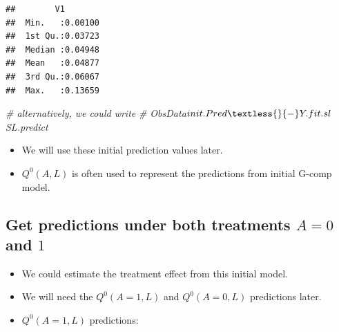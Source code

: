 \documentclass[
]{book}
\newenvironment{Shaded}{\begin{snugshade}}{\end{snugshade}}
\newcommand{\AttributeTok}[1]{\textcolor[rgb]{0.77,0.63,0.00}{#1}}
\newcommand{\CommentTok}[1]{\textcolor[rgb]{0.56,0.35,0.01}{\textit{#1}}}
\newcommand{\DecValTok}[1]{\textcolor[rgb]{0.00,0.00,0.81}{#1}}
\newcommand{\FunctionTok}[1]{\textcolor[rgb]{0.00,0.00,0.00}{#1}}
\newcommand{\NormalTok}[1]{#1}
\newcommand{\OtherTok}[1]{\textcolor[rgb]{0.56,0.35,0.01}{#1}}
\newcommand{\SpecialCharTok}[1]{\textcolor[rgb]{0.00,0.00,0.00}{#1}}
\newcommand{\StringTok}[1]{\textcolor[rgb]{0.31,0.60,0.02}{#1}}
\providecommand{\tightlist}{%
  \setlength{\itemsep}{0pt}\setlength{\parskip}{0pt}}
\begin{document}
\begin{verbatim}
##        V1         
##  Min.   :0.00100  
##  1st Qu.:0.03723  
##  Median :0.04948  
##  Mean   :0.04877  
##  3rd Qu.:0.06067  
##  Max.   :0.13659
\end{verbatim}

\begin{Shaded}
\begin{Highlighting}[]
\CommentTok{\# alternatively, we could write}
\CommentTok{\# ObsData$init.Pred \textless{}{-} Y.fit.sl$SL.predict}
\end{Highlighting}
\end{Shaded}

\begin{itemize}
\tightlist
\item
  We will use these initial prediction values later.
\item
  \(Q^0(A,L)\) is often used to represent the predictions from initial G-comp model.
\end{itemize}

\hypertarget{get-predictions-under-both-treatments-a-0-and-1}{%
\subsection{\texorpdfstring{Get predictions under both treatments \(A = 0\) and \(1\)}{Get predictions under both treatments A = 0 and 1}}\label{get-predictions-under-both-treatments-a-0-and-1}}

\begin{itemize}
\tightlist
\item
  We could estimate the treatment effect from this initial model.
\item
  We will need the \(Q^0(A=1,L)\) and \(Q^0(A=0,L)\) predictions later.
\item
  \(Q^0(A=1,L)\) predictions:
\end{itemize}

\begin{Shaded}
\end{Shaded}
\end{document}
